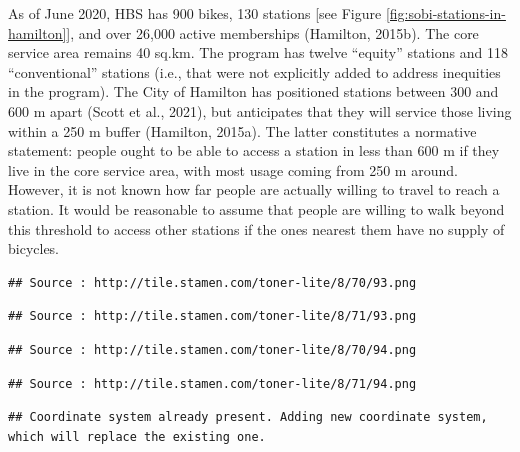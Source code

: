 \documentclass[]{elsarticle} %
\begin{document}
As of June 2020, HBS has 900 bikes, 130 stations {[}see Figure
\ref{fig:sobi-stations-in-hamilton}{]}, and over 26,000 active
memberships (Hamilton, 2015b). The core service area remains 40 sq.km.
The program has twelve ``equity'' stations and 118 ``conventional''
stations (i.e., that were not explicitly added to address inequities in
the program). The City of Hamilton has positioned stations between 300
and 600 m apart (Scott et al., 2021), but anticipates that they will
service those living within a 250 m buffer (Hamilton, 2015a). The latter
constitutes a normative statement: people ought to be able to access a
station in less than 600 m if they live in the core service area, with
most usage coming from 250 m around. However, it is not known how far
people are actually willing to travel to reach a station. It would be
reasonable to assume that people are willing to walk beyond this
threshold to access other stations if the ones nearest them have no
supply of bicycles.

\begin{verbatim}
## Source : http://tile.stamen.com/toner-lite/8/70/93.png
\end{verbatim}

\begin{verbatim}
## Source : http://tile.stamen.com/toner-lite/8/71/93.png
\end{verbatim}

\begin{verbatim}
## Source : http://tile.stamen.com/toner-lite/8/70/94.png
\end{verbatim}

\begin{verbatim}
## Source : http://tile.stamen.com/toner-lite/8/71/94.png
\end{verbatim}

\begin{verbatim}
## Coordinate system already present. Adding new coordinate system, which will replace the existing one.
\end{verbatim}
\end{document}
